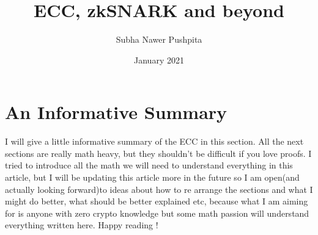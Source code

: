 \documentclass[12pt,letterpaper]{article}
\title{ECC, zkSNARK and beyond}
\author{Subha Nawer Pushpita}
\date{January 2021}
\begin{document}
\maketitle

\section{An Informative Summary}
I will give a little informative summary of the ECC in this section. All the next sections are really math heavy, but they shouldn't be difficult if you love proofs. I tried to introduce all the math we will need to understand everything in this article, but I will be updating this article more in the future so I am open(and actually looking forward)to ideas about how to re arrange the sections and what I might do better, what should be better explained etc, because what I am aiming for is anyone with zero crypto knowledge but some math passion will understand everything written here. Happy reading ! 
\end{document}
